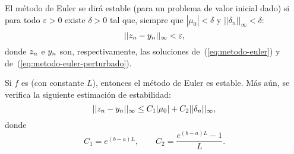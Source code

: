 \begin{definition}
  \label{def:estabilidad}
  El método de Euler se dirá estable (para un problema de valor inicial
  dado) si para todo $\varepsilon>0$ existe $\delta>0$ tal que, siempre
  que $|\mu_0|<\delta$ y $||\delta_n||_\infty<\delta$:
  \begin{equation*}
    ||{z_n} - {y_n}||_\infty<\varepsilon,
  \end{equation*}
  donde ${z_n}$ e ${y_n}$ son, respectivamente, las soluciones
  de~(\ref{eq:metodo-euler}) y de~(\ref{eq:metodo-euler-perturbado}).
\end{definition}

\begin{theorem}
  \label{thm:estabilidad-euler}
  Si $f$ es \globLipschitz (con constante $L$), entonces el método de
  Euler es estable. Más aún, se verifica la siguiente estimación de
  estabilidad:
  \begin{equation*}
    ||{z_n} - {y_n}||_\infty \le C_1|\mu_0| + C_2 ||\delta_n||_\infty,
  \end{equation*}
  donde
  \begin{equation}
    \label{eq:euler-ctes-estimacion-estabilidad}
    C_1=e^{(b-a)L}, \qquad C_2=\frac{e^{(b-a)L}-1}{L}.
  \end{equation}
\end{theorem}

